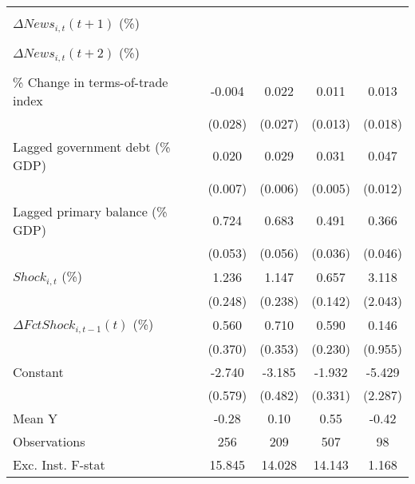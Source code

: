 {\begin{tabular}{l*{4}{c}}
                    &                     &                     &                     &                     \\
\addlinespace
$ \Delta News_{i,t}(t+1)$ (\%)&                     &                     &                     &                     \\
                    &                     &                     &                     &                     \\
\addlinespace
$ \Delta News_{i,t}(t+2)$ (\%)&                     &                     &                     &                     \\
                    &                     &                     &                     &                     \\
\addlinespace
\% Change in terms-of-trade index&      -0.004         &       0.022         &       0.011         &       0.013         \\
                    &     (0.028)         &     (0.027)         &     (0.013)         &     (0.018)         \\
\addlinespace
Lagged government debt (\% GDP)&       0.020\sym{**} &       0.029\sym{***}&       0.031\sym{***}&       0.047\sym{***}\\
                    &     (0.007)         &     (0.006)         &     (0.005)         &     (0.012)         \\
\addlinespace
Lagged primary balance (\% GDP)&       0.724\sym{***}&       0.683\sym{***}&       0.491\sym{***}&       0.366\sym{***}\\
                    &     (0.053)         &     (0.056)         &     (0.036)         &     (0.046)         \\
\addlinespace
$ Shock_{i,t}$ (\%) &       1.236\sym{***}&       1.147\sym{***}&       0.657\sym{***}&       3.118         \\
                    &     (0.248)         &     (0.238)         &     (0.142)         &     (2.043)         \\
\addlinespace
$ \Delta FctShock_{i,t-1}(t)$ (\%)&       0.560         &       0.710\sym{*}  &       0.590\sym{**} &       0.146         \\
                    &     (0.370)         &     (0.353)         &     (0.230)         &     (0.955)         \\
\addlinespace
Constant            &      -2.740\sym{***}&      -3.185\sym{***}&      -1.932\sym{***}&      -5.429\sym{**} \\
                    &     (0.579)         &     (0.482)         &     (0.331)         &     (2.287)         \\
\midrule
Mean Y              &       -0.28         &        0.10         &        0.55         &       -0.42         \\
Observations        &         256         &         209         &         507         &          98         \\
Exc. Inst. F-stat   &      15.845         &      14.028         &      14.143         &       1.168         \\
\bottomrule
\end{tabular}
}
